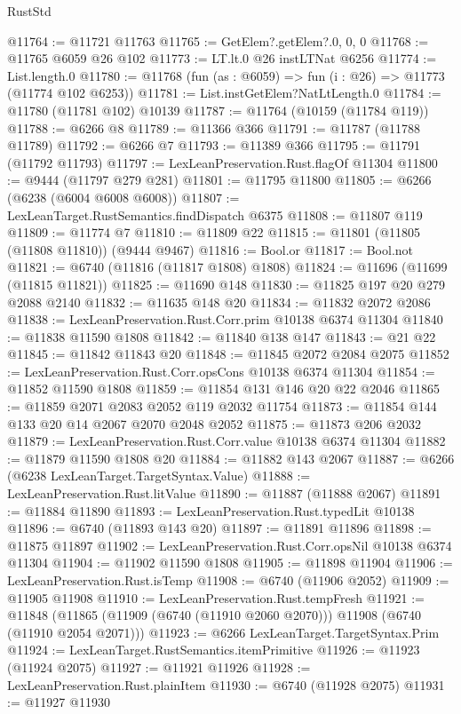 \begin{lexlean}{RustStd}
\begin{coremodule}
@11764 := @11721 @11763
@11765 := GetElem?.getElem?.{0, 0, 0}
@11768 := @11765 @6059 @26 @102
@11773 := LT.lt.{0} @26 instLTNat @6256
@11774 := List.length.{0}
@11780 := @11768 (fun (as : @6059) => fun (i : @26) => @11773 (@11774 @102 @6253))
@11781 := List.instGetElem?NatLtLength.{0}
@11784 := @11780 (@11781 @102) @10139
@11787 := @11764 (@10159 (@11784 @119))
@11788 := @6266 @8
@11789 := @11366 @366
@11791 := @11787 (@11788 @11789)
@11792 := @6266 @7
@11793 := @11389 @366
@11795 := @11791 (@11792 @11793)
@11797 := LexLeanPreservation.Rust.flagOf @11304
@11800 := @9444 (@11797 @279 @281)
@11801 := @11795 @11800
@11805 := @6266 (@6238 (@6004 @6008 @6008))
@11807 := LexLeanTarget.RustSemantics.findDispatch @6375
@11808 := @11807 @119
@11809 := @11774 @7
@11810 := @11809 @22
@11815 := @11801 (@11805 (@11808 @11810)) (@9444 @9467)
@11816 := Bool.or
@11817 := Bool.not
@11821 := @6740 (@11816 (@11817 @1808) @1808)
@11824 := @11696 (@11699 (@11815 @11821))
@11825 := @11690 @148
@11830 := @11825 @197 @20 @279 @2088 @2140
@11832 := @11635 @148 @20
@11834 := @11832 @2072 @2086
@11838 := LexLeanPreservation.Rust.Corr.prim @10138 @6374 @11304
@11840 := @11838 @11590 @1808
@11842 := @11840 @138 @147
@11843 := @21 @22
@11845 := @11842 @11843 @20
@11848 := @11845 @2072 @2084 @2075
@11852 := LexLeanPreservation.Rust.Corr.opsCons @10138 @6374 @11304
@11854 := @11852 @11590 @1808
@11859 := @11854 @131 @146 @20 @22 @2046
@11865 := @11859 @2071 @2083 @2052 @119 @2032 @11754
@11873 := @11854 @144 @133 @20 @14 @2067 @2070 @2048 @2052
@11875 := @11873 @206 @2032
@11879 := LexLeanPreservation.Rust.Corr.value @10138 @6374 @11304
@11882 := @11879 @11590 @1808 @20
@11884 := @11882 @143 @2067
@11887 := @6266 (@6238 LexLeanTarget.TargetSyntax.Value)
@11888 := LexLeanPreservation.Rust.litValue
@11890 := @11887 (@11888 @2067)
@11891 := @11884 @11890
@11893 := LexLeanPreservation.Rust.typedLit @10138
@11896 := @6740 (@11893 @143 @20)
@11897 := @11891 @11896
@11898 := @11875 @11897
@11902 := LexLeanPreservation.Rust.Corr.opsNil @10138 @6374 @11304
@11904 := @11902 @11590 @1808
@11905 := @11898 @11904
@11906 := LexLeanPreservation.Rust.isTemp
@11908 := @6740 (@11906 @2052)
@11909 := @11905 @11908
@11910 := LexLeanPreservation.Rust.tempFresh
@11921 := @11848 (@11865 (@11909 (@6740 (@11910 @2060 @2070))) @11908 (@6740 (@11910 @2054 @2071)))
@11923 := @6266 LexLeanTarget.TargetSyntax.Prim
@11924 := LexLeanTarget.RustSemantics.itemPrimitive
@11926 := @11923 (@11924 @2075)
@11927 := @11921 @11926
@11928 := LexLeanPreservation.Rust.plainItem
@11930 := @6740 (@11928 @2075)
@11931 := @11927 @11930

\end{coremodule}
\end{lexlean}
